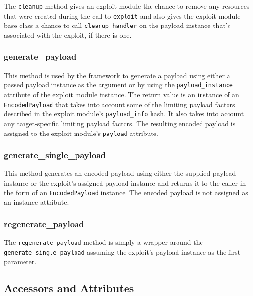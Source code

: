 \documentclass{report}
\begin{document}
\par
The \texttt{cleanup} method gives an exploit module the chance to
remove any resources that were created during the call to
\texttt{exploit} and also gives the exploit module base class a
chance to call \texttt{cleanup\_handler} on the payload instance
that's associated with the exploit, if there is one.

            \subsubsection{generate\_payload}

\par
This method is used by the framework to generate a payload using
either a passed payload instance as the argument or by using the
\texttt{payload\_instance} attribute of the exploit module instance.
The return value is an instance of an \texttt{EncodedPayload} that
takes into account some of the limiting payload factors described in
the exploit module's \texttt{payload\_info} hash.  It also takes
into account any target-specific limiting payload factors.  The
resulting encoded payload is assigned to the exploit module's
\texttt{payload} attribute.

            \subsubsection{generate\_single\_payload}

\par
This method generates an encoded payload using either the supplied
payload instance or the exploit's assigned payload instance and
returns it to the caller in the form of an \texttt{EncodedPayload}
instance. The encoded payload is not assigned as an instance
attribute.

            \subsubsection{regenerate\_payload}

\par
The \texttt{regenerate\_payload} method is simply a wrapper around
the \texttt{generate\_single\_payload} assuming the exploit's
payload instance as the first parameter.

        \subsection{Accessors and Attributes}
\end{document}

